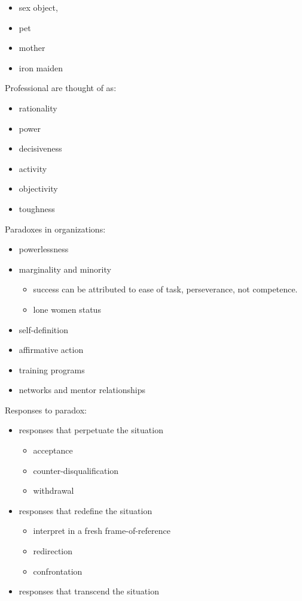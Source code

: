 \documentclass[
]{book}
\begin{document}
\begin{itemize}
\item
  sex object,
\item
  pet
\item
  mother
\item
  iron maiden
\end{itemize}

Professional are thought of as:

\begin{itemize}
\item
  rationality
\item
  power
\item
  decisiveness
\item
  activity
\item
  objectivity
\item
  toughness
\end{itemize}

Paradoxes in organizations:

\begin{itemize}
\item
  powerlessness
\item
  marginality and minority

  \begin{itemize}
  \item
    success can be attributed to ease of task, perseverance, not
    competence.
  \item
    lone women status
  \end{itemize}
\item
  self-definition
\item
  affirmative action
\item
  training programs
\item
  networks and mentor relationships
\end{itemize}

Responses to paradox:

\begin{itemize}
\item
  responses that perpetuate the situation

  \begin{itemize}
  \item
    acceptance
  \item
    counter-disqualification
  \item
    withdrawal
  \end{itemize}
\item
  responses that redefine the situation

  \begin{itemize}
  \item
    interpret in a fresh frame-of-reference
  \item
    redirection
  \item
    confrontation
  \end{itemize}
\item
  responses that transcend the situation
\end{itemize}
\end{document}
